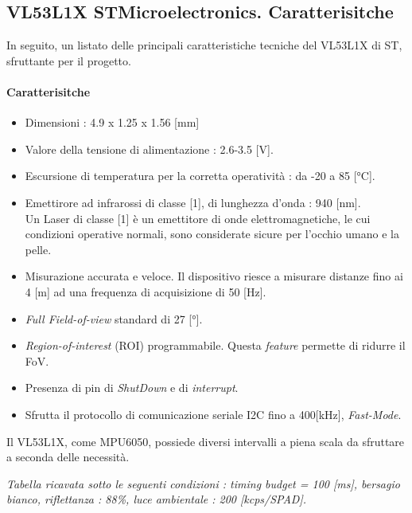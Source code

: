 \documentclass[11pt]{report}
\begin{document}
\subsection{VL53L1X STMicroelectronics. Caratterisitche}
In seguito, un listato delle principali caratteristiche tecniche del VL53L1X di ST, sfruttante per il progetto.\\
\paragraph{Caratterisitche}
\begin{itemize}
\item Dimensioni : 4.9 x 1.25 x 1.56 [mm]
\item Valore della tensione di alimentazione : 2.6-3.5 [V].
\item Escursione di temperatura per la corretta operatività : da -20 a 85 [°C].
\item Emettirore ad infrarossi di classe [1], di lunghezza d'onda : 940 [nm]. \\Un Laser di classe [1] è un emettitore di onde elettromagnetiche, le cui condizioni operative normali, sono considerate sicure per l'occhio umano e la pelle.
\item Misurazione accurata e veloce. Il dispositivo riesce a misurare distanze fino ai 4 [m] ad una frequenza di acquisizione di 50 [Hz].
\item \textit{Full Field-of-view} standard di 27 [°].
\item \textit{Region-of-interest} (ROI) programmabile. Questa \textit{feature} permette di ridurre il FoV.
\item Presenza di pin di \textit{ShutDown} e di \textit{interrupt}.
\item Sfrutta il protocollo di comunicazione seriale I2C fino a 400[kHz], \textit{Fast-Mode}.
\end{itemize}
Il VL53L1X, come MPU6050, possiede diversi intervalli a piena scala da sfruttare a seconda delle necessità.
\begin{table}[H]
    \centering
    \caption{\textit{Distance mode} del VL53L1X STMicroelectronics.}
    \label{tab: tabella}
\end{table}
\begin{center}
    \footnotesize \textit{Tabella ricavata sotto le seguenti condizioni : \textit{timing budget} = 100 [ms], bersagio bianco, riflettanza : 88\%, luce ambientale : 200 [kcps/SPAD].}
\end{center}
\end{document}
